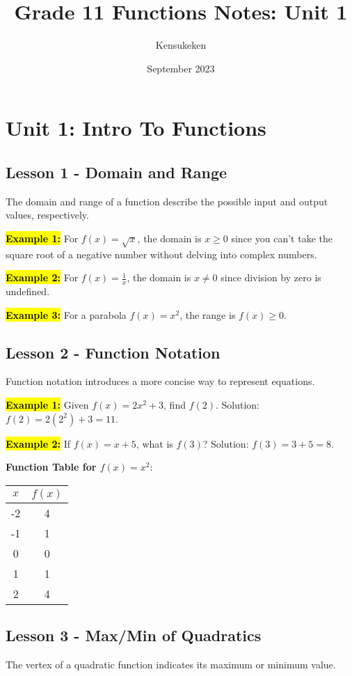 \documentclass[12pt,a4paper]{article}
\title{Grade 11 Functions Notes: Unit 1}
\author{Kensukeken}
\date{September 2023}
\begin{document}
\maketitle

\section*{Unit 1: Intro To Functions}

\subsection*{Lesson 1 - Domain and Range}
The domain and range of a function describe the possible input and output values, respectively.



\textbf{\hl{Example 1:}} For \(f(x) = \sqrt{x}\), the domain is \(x \geq 0\) since you can't take the square root of a negative number without delving into complex numbers.

\textbf{\hl{Example 2:}} For \(f(x) = \frac{1}{x}\), the domain is \(x \neq 0\) since division by zero is undefined.

\textbf{\hl{Example 3:}} For a parabola \(f(x) = x^2\), the range is \(f(x) \geq 0\).

\subsection*{Lesson 2 - Function Notation}
Function notation introduces a more concise way to represent equations.

\textbf{\hl{Example 1:}} Given \(f(x) = 2x^2 + 3\), find \(f(2)\). Solution: \(f(2) = 2(2^2) + 3 = 11\).

\textbf{\hl{Example 2:}} If \(f(x) = x + 5\), what is \(f(3)\)? Solution: \(f(3) = 3 + 5 = 8\).

\textbf{Function Table for \(f(x) = x^2\)}:
\begin{center}
    \begin{tabular}{c|c}
        \( x \) & \( f(x) \) \\
        \hline
        -2 & 4 \\
        -1 & 1 \\
        0 & 0 \\
        1 & 1 \\
        2 & 4 \\
    \end{tabular}
\end{center}
\newpage
\subsection*{Lesson 3 - Max/Min of Quadratics}
The vertex of a quadratic function indicates its maximum or minimum value.
\end{document}
